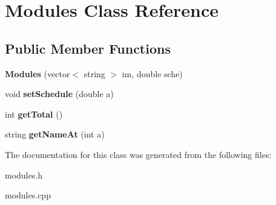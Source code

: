 \hypertarget{classModules}{}\section{Modules Class Reference}
\label{classModules}
\subsection*{Public Member Functions}
\begin{DoxyCompactItemize}
\item 
{\bfseries Modules} (vector$<$ string $>$ im, double sche)\hypertarget{classModules_a49cce610e2677d860dda8999ed68878b}{}\label{classModules_a49cce610e2677d860dda8999ed68878b}

\item 
void {\bfseries set\+Schedule} (double a)\hypertarget{classModules_ace696d74c2965feceede8db124cb1bfd}{}\label{classModules_ace696d74c2965feceede8db124cb1bfd}

\item 
int {\bfseries get\+Total} ()\hypertarget{classModules_a69650dfe73d4ee87df5286d861ecb323}{}\label{classModules_a69650dfe73d4ee87df5286d861ecb323}

\item 
string {\bfseries get\+Name\+At} (int a)\hypertarget{classModules_a9d31e4d161435e558a6f47014846f62e}{}\label{classModules_a9d31e4d161435e558a6f47014846f62e}

\end{DoxyCompactItemize}


The documentation for this class was generated from the following files\+:\begin{DoxyCompactItemize}
\item 
modules.\+h\item 
modules.\+cpp\end{DoxyCompactItemize}
